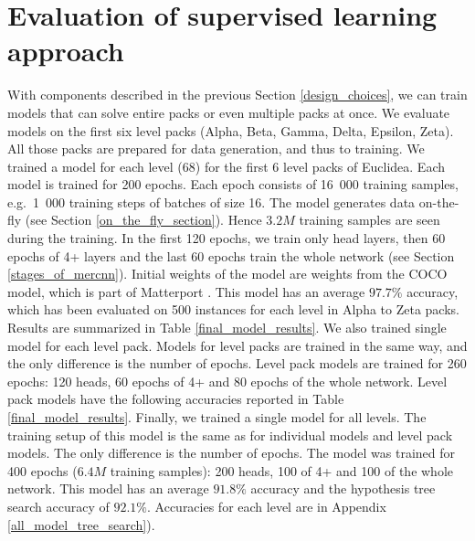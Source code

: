 \section{Evaluation of supervised learning approach}
\label{supervised_evaluation}
With components described in the previous Section \ref{design_choices}, we can train models that can solve entire packs or even multiple packs at once. We evaluate models on the first six level packs (Alpha, Beta, Gamma, Delta, Epsilon, Zeta). All those packs are prepared for data generation, and thus to training. 
\newline \newline
We trained a model for each level (68) for the first 6 level packs of Euclidea. Each model is trained for 200 epochs. Each epoch consists of 16~000 training samples, e.g.~1~000 training steps of batches of size 16. The model generates data on-the-fly (see Section \ref{on_the_fly_section}). Hence $3.2M$ training samples are seen during the training. In the first 120 epochs, we train only head layers, then 60 epochs of 4+ layers and the last 60 epochs train the whole network (see Section \ref{stages_of_mercnn}). Initial weights of the model are weights from the COCO model, which is part of Matterport \cite{matterport_maskrcnn_2017}. This model has an average $97.7\%$ accuracy, which has been evaluated on 500 instances for each level in Alpha to Zeta packs. Results are summarized in Table \ref{final_model_results}.
\newline \newline
We also trained single model for each level pack. Models for level packs are trained in the same way, and the only difference is the number of epochs. Level pack models are trained for 260 epochs: 120 heads, 60 epochs of 4+ and 80 epochs of the whole network. Level pack models have the following accuracies reported in Table \ref{final_model_results}.
\newline \newline
Finally, we trained a single model for all levels. The training setup of this model is the same as for individual models and level pack models. The only difference is the number of epochs. The model was trained for 400 epochs ($6.4M$ training samples): 200 heads, 100 of 4+ and 100 of the whole network. This model has an average $91.8\%$ accuracy and the hypothesis tree search accuracy of $92.1\%$. Accuracies for each level are in Appendix \ref{all_model_tree_search}).
\newline \newline
